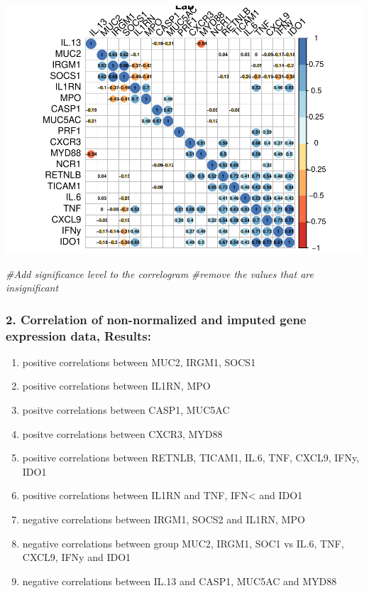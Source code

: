 \documentclass[
]{article}
\newenvironment{Shaded}{\begin{snugshade}}{\end{snugshade}}
\newcommand{\CommentTok}[1]{\textcolor[rgb]{0.56,0.35,0.01}{\textit{#1}}}
\providecommand{\tightlist}{%
  \setlength{\itemsep}{0pt}\setlength{\parskip}{0pt}}
\begin{document}
\includegraphics{Testing_normalization_imputation_order_files/figure-latex/unnamed-chunk-6-1.pdf}

\begin{Shaded}
\begin{Highlighting}[]
  \CommentTok{\#Add significance level to the correlogram}
\CommentTok{\#remove the values that are insignificant}
\end{Highlighting}
\end{Shaded}

\hypertarget{correlation-of-non-normalized-and-imputed-gene-expression-data-results}{%
\subsubsection{2. Correlation of non-normalized and imputed gene
expression data,
Results:}\label{correlation-of-non-normalized-and-imputed-gene-expression-data-results}}

\begin{enumerate}
\def\labelenumi{\alph{enumi}.}
\tightlist
\item
  positive correlations between MUC2, IRGM1, SOCS1
\item
  positive correlations between IL1RN, MPO
\item
  positve correlations between CASP1, MUC5AC
\item
  positve correlations between CXCR3, MYD88
\item
  positive correlations between RETNLB, TICAM1, IL.6, TNF, CXCL9, IFNy,
  IDO1
\item
  positive correlations between IL1RN and TNF, IFN\textless{} and IDO1
\item
  negative correlations between IRGM1, SOCS2 and IL1RN, MPO
\item
  negative correlations between group MUC2, IRGM1, SOC1 vs IL.6, TNF,
  CXCL9, IFNy and IDO1
\item
  negative correlations between IL.13 and CASP1, MUC5AC and MYD88
\end{enumerate}
\end{document}
